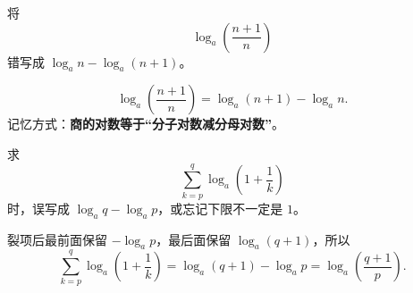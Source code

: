 \begin{trapbox}
	\medskip
	\begin{description}[style=nextline, leftmargin=2.8em, labelsep=0.5em, itemsep=0.35em]
		\item[\textbf{\textcolor{CTrap}{易错点四（裂项方向写反）}}]
		      将
		      \[
			      \log_a\!\left(\frac{n+1}{n}\right)
		      \]
		      错写成 \(\log_a n-\log_a(n+1)\)。

		\item[\textbf{\textcolor{CTrap}{正确理解（分子在前，分母在后）：}}]
		      \[
			      \log_a\!\left(\frac{n+1}{n}\right)
			      =\log_a(n+1)-\log_a n.
		      \]
		      记忆方式：\textbf{商的对数等于“分子对数减分母对数”}。
	\end{description}

	\medskip
	\begin{description}[style=nextline, leftmargin=2.8em, labelsep=0.5em, itemsep=0.35em]
		\item[\textbf{\textcolor{CTrap}{易错点五（求和端点错误）}}]
		      求
		      \[
			      \sum_{k=p}^{q}\log_a\!\left(1+\frac{1}{k}\right)
		      \]
		      时，误写成 \(\log_a q-\log_a p\)，或忘记下限不一定是 \(1\)。

		\item[\textbf{\textcolor{CTrap}{正确理解（保留前负后正）：}}]
		      裂项后最前面保留 \(-\log_a p\)，最后面保留 \(\log_a(q+1)\)，所以
		      \[
			      \sum_{k=p}^{q}\log_a\!\left(1+\frac{1}{k}\right)
			      =\log_a(q+1)-\log_a p
			      =\log_a\!\left(\frac{q+1}{p}\right).
		      \]
	\end{description}
\end{trapbox}